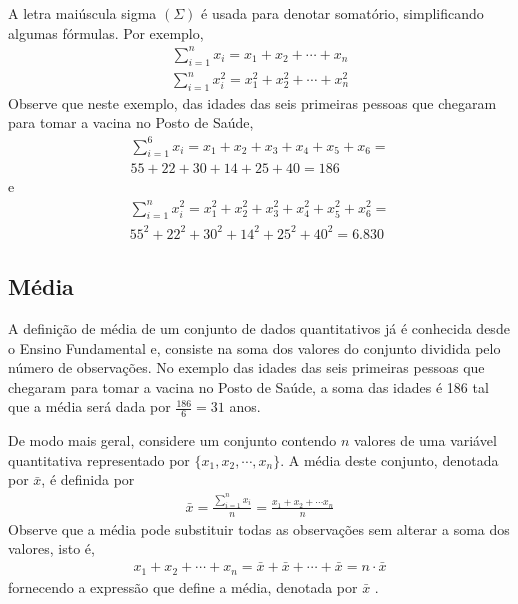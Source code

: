 A letra maiúscula sigma \(\left (\Sigma\right )\) é usada para denotar somatório, simplificando algumas fórmulas. Por exemplo,
\begin{equation*}
\begin{split}\sum^n_{i=1} x_i=x_1+x_2+\cdots +x_n\end{split}
\end{equation*}
\begin{equation*}
\begin{split}\sum^n_{i=1} x^2_i=x^2_1+x^2_2+\cdots +x^2_n\end{split}
\end{equation*}
Observe que neste exemplo, das idades das seis primeiras pessoas que chegaram para tomar a vacina no Posto de Saúde,
\begin{equation*}
\begin{split}\sum^6_{i=1}x_i=x_1+x_2+x_3+x_4+x_5+x_6=\\
55 + 22 + 30 + 14 + 25 + 40 = 186\end{split}
\end{equation*}
e
\begin{equation*}
\begin{split}\sum^n_{i=1} x^2_i=x^2_1+x^2_2+x^2_3+x^2_4+x^2_5 +x^2_6=\\
55^2+ 22^2+ 30^2+ 14^2+ 25^2+  40^2=6.830\end{split}
\end{equation*}

\subsection{Média}

A definição de média de um conjunto de dados quantitativos já é conhecida desde o Ensino Fundamental e, consiste na soma dos valores do conjunto dividida pelo número de observações. No exemplo das idades das seis primeiras pessoas que chegaram para tomar a vacina no Posto de Saúde, a soma das idades é 186 tal que a média será dada por \(\frac{186}{6}=31\) anos.

De modo mais geral, considere um conjunto contendo \(n\) valores de uma variável quantitativa representado por \(\{x_1,x_2,\cdots,x_n\}\).
A média deste conjunto, denotada por \(\bar{x}\),  é definida por
\begin{equation*}
\begin{split}\bar{x}=\frac{\sum^n_{i=1}x_i}{n}=\frac{x_1+x_2+\cdots x_n}{n}\end{split}
\end{equation*}
Observe que a média pode substituir todas as observações sem alterar a  soma dos valores, isto é,
\begin{equation*}
\begin{split}x_1+x_2+\cdots+x_n=\bar{x}+\bar{x}+\cdots+\bar{x} = n\cdot \bar{x}\end{split}
\end{equation*}
fornecendo a expressão que define a média, denotada por \(\bar{x}\) .

